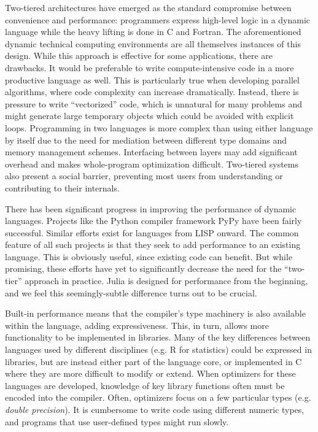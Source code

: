\documentclass[9pt]{sigplanconf}
\begin{document}
Two-tiered architectures have emerged as the standard compromise between
convenience and performance: programmers express high-level logic in a
dynamic language while the heavy lifting is done in C and Fortran. The
aforementioned dynamic technical computing environments are all themselves
instances of this design. While this approach is effective for some
applications, there are drawbacks. It would be preferable to write
compute-intensive code in a more productive language as well. This is
particularly true when developing parallel algorithms, where code
complexity can increase dramatically. Instead, there is pressure to write
``vectorized'' code, which is unnatural for many problems and might
generate large temporary objects which could be avoided with explicit
loops. Programming in two languages is more complex than using either
language by itself due to the need for mediation between different type
domains and memory management schemes. Interfacing between layers may add
significant overhead and makes whole-program optimization difficult.
Two-tiered systems also present a social barrier, preventing most users
from understanding or contributing to their internals.

There has been significant progress in improving the performance of
dynamic languages. Projects like the Python compiler framework PyPy
\cite{pypyjit} have been fairly successful. Similar efforts exist for
languages from LISP onward. The common feature of all such projects is
that they seek to add performance to an existing language. This is
obviously useful, since existing code can benefit. But while promising,
these efforts have yet to significantly decrease the need for the
``two-tier'' approach in practice. Julia is designed for performance from
the beginning, and we feel this seemingly-subtle difference turns out to
be crucial.


Built-in performance means that the compiler's type machinery is
also available within the language, adding expressiveness. This, in turn,
allows more functionality to be implemented in libraries. Many of the key
differences between languages used by different disciplines (e.g. R for
statistics) could be expressed in libraries, but are instead either part
of the language core, or implemented in C where they are more difficult to
modify or extend. When optimizers for these languages are developed,
knowledge of key library functions often must be encoded into the
compiler. Often, optimizers focus on a few particular types (e.g. {\it
double precision}). It is cumbersome to write code using different numeric
types, and programs that use user-defined types might run slowly.
\end{document}
